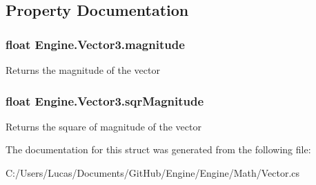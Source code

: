 \subsection{Property Documentation}
\hypertarget{struct_engine_1_1_vector3_a66f331809cd25cdaf64b869a9285231b}{
\subsubsection[{magnitude}]{\setlength{\rightskip}{0pt plus 5cm}float Engine.\-Vector3.\-magnitude\hspace{0.3cm}{\ttfamily [get]}}}\label{struct_engine_1_1_vector3_a66f331809cd25cdaf64b869a9285231b}


Returns the magnitude of the vector 

\hypertarget{struct_engine_1_1_vector3_ab57e7c3bf34edb840b78147df9915953}{
\subsubsection[{sqr\-Magnitude}]{\setlength{\rightskip}{0pt plus 5cm}float Engine.\-Vector3.\-sqr\-Magnitude\hspace{0.3cm}{\ttfamily [get]}}}\label{struct_engine_1_1_vector3_ab57e7c3bf34edb840b78147df9915953}


Returns the square of magnitude of the vector 



The documentation for this struct was generated from the following file\-:\begin{DoxyCompactItemize}
\item 
C\-:/\-Users/\-Lucas/\-Documents/\-Git\-Hub/\-Engine/\-Engine/\-Math/Vector.\-cs\end{DoxyCompactItemize}
